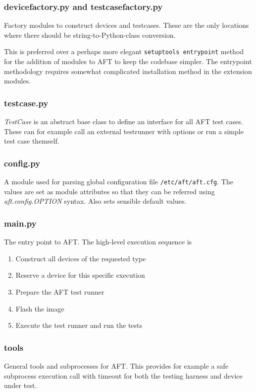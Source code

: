 \documentclass[a4paper,11pt]{article}
\newcommand{\cmd}[1]{\texttt{#1}}
\begin{document}
\subsubsection*{devicefactory.py and testcasefactory.py}
Factory modules to construct devices and testcases. These are the only locations where there should be string-to-Python-class conversion.

This is preferred over a perhaps more elegant \cmd{setuptools entrypoint} method for the addition of modules to AFT to keep the codebase simpler. The entrypoint methodology requires somewhat complicated installation method in the extension modules.

\subsubsection*{testcase.py}
\emph{TestCase} is an abstract base class to define an interface for all AFT test cases. These can for example call an external testrunner with options or run a simple test case themself.

\subsubsection*{config.py}
A module used for parsing global configuration file \cmd{/etc/aft/aft.cfg}. The values are set as module attributes so that they can be referred using \emph{aft.config.OPTION} syntax. Also sets sensible default values.

\subsubsection*{main.py}
The entry point to AFT. The high-level execution sequence is
\begin{enumerate}
\item Construct all devices of the requested type
\item Reserve a device for this specific execution
\item Prepare the AFT test runner
\item Flash the image
\item Execute the test runner and run the tests
\end{enumerate}

\subsubsection*{tools}
General tools and subprocesses for AFT. This provides for example a safe subprocess execution call with timeout for both the testing harness and device under test.
\end{document}
